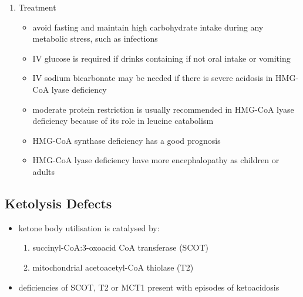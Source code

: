 \documentclass{scrartcl}
\begin{document}
\begin{enumerate}
\item Treatment
\label{sec:orgfd18702}
\begin{itemize}
\item avoid fasting and maintain  high carbohydrate intake during any
metabolic stress, such as infections
\item IV glucose is required if drinks containing if not oral intake or vomiting
\item IV sodium bicarbonate may be needed if there is severe acidosis in
HMG-CoA lyase deficiency
\item moderate protein restriction is usually recommended in HMG-CoA
lyase deficiency because of its role in leucine catabolism
\item HMG-CoA synthase deficiency has a good prognosis
\item HMG-CoA lyase deficiency have more encephalopathy as children or adults
\end{itemize}
\end{enumerate}

\subsection{Ketolysis Defects}
\label{sec:org655aeb0}
\begin{itemize}
\item ketone body utilisation is catalysed by:
\begin{enumerate}
\item succinyl-CoA:3-oxoacid CoA transferase (SCOT)
\item mitochondrial acetoacetyl-CoA thiolase (T2)
\end{enumerate}
\item deficiencies of SCOT, T2 or MCT1 present with episodes of ketoacidosis
\end{itemize}
\end{document}
